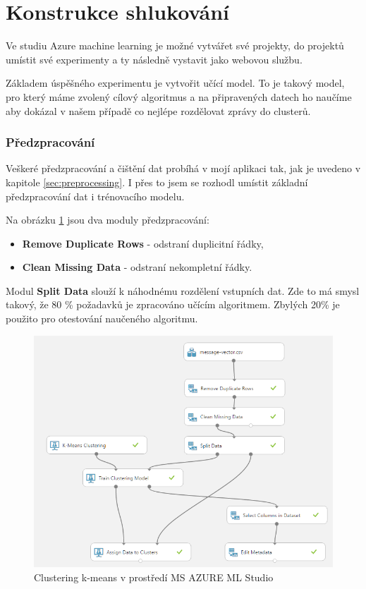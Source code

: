 \documentclass[thesis=M,czech]{FITthesis}[2012/10/20]
\newcommand{\tmpframe}[1]{\fbox{#1}}
\renewcommand{\tmpframe}[1]{#1}
\begin{document}
		
	\section{Konstrukce shlukování}
		\label{sec:construc_clustering}		
		Ve studiu Azure machine learning je možné vytvářet své projekty, do projektů umístit své experimenty a ty následně vystavit jako webovou službu.
		
		Základem úspěšného experimentu je vytvořit učící model. To je takový model, pro který máme zvolený cílový algoritmus a na připravených datech ho naučíme aby dokázal v našem případě co nejlépe rozdělovat zprávy do clusterů.
		
		\subsubsection{Předzpracování}
		Veškeré předzpracování a čištění dat probíhá v mojí aplikaci tak, jak je uvedeno v kapitole \ref{sec:preprocessing}. I přes to jsem se rozhodl umístit základní předzpracování dat i trénovacího modelu.
		
		Na obrázku \ref{fig:k-means_azure} jsou dva moduly předzpracování:
		
		\begin{itemize} 
			\item \textbf{Remove Duplicate Rows} - odstraní duplicitní řádky,
			\item \textbf{Clean Missing Data} - odstraní nekompletní řádky.	
		\end{itemize}
	
		Modul \textbf{Split Data} slouží k náhodnému rozdělení vstupních dat. Zde to má smysl takový, že 80 \% požadavků je zpracováno učícím algoritmem. Zbylých 20\% je použito pro otestování naučeného algoritmu. 
		
		\begin{figure}[htb]\centering
			\tmpframe{\includegraphics[width=\textwidth]{./img/azureTrainingKmeans}}	
			\caption{Clustering k-means v prostředí MS AZURE ML Studio}
			\label{fig:k-means_azure}
		\end{figure}
	
\end{document}
